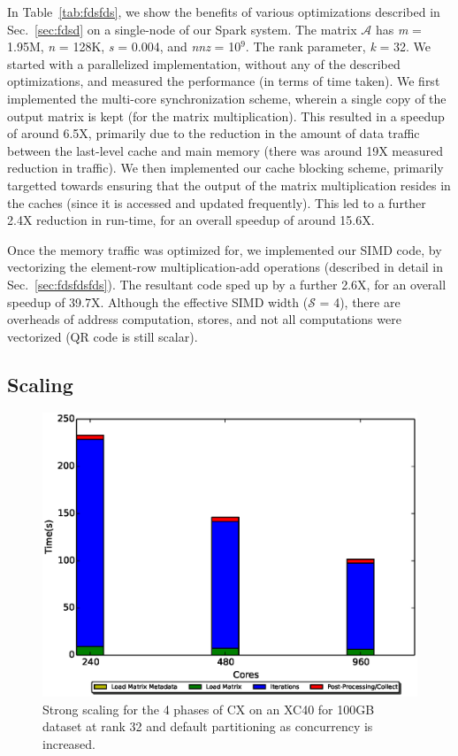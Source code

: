   In Table~\ref{tab:fdsfds}, we show the benefits of various
  optimizations described in Sec.~\ref{sec:fdsd} on a single-node of our Spark system. 
  The matrix $\mathcal{A}$ has {\it{m}} = 1.95M, {\it{n}} = 128K,
  {\it{s}} = 0.004, and {\it{nnz}} = 10$^9$. The rank parameter,
  {\it{k}} = 32. We started with a parallelized implementation,
  without any of the described optimizations, and measured the 
  performance (in terms of time taken). We first implemented the 
  multi-core synchronization scheme, wherein a single copy of the 
  output matrix is kept (for the matrix multiplication).
  This resulted in a speedup of around 6.5X, primarily due to
  the reduction in the amount of data traffic between the 
  last-level cache and main memory (there was around 19X measured reduction
  in traffic). We then implemented our cache blocking scheme,
  primarily targetted towards ensuring that the output of the 
  matrix multiplication resides in the caches (since it is
  accessed and updated frequently). This led to a further 2.4X
 reduction in run-time, for an overall speedup of around 15.6X.

 Once the memory traffic was optimized for, we implemented our 
 SIMD code, by vectorizing the element-row multiplication-add
 operations (described in detail in Sec.~\ref{sec:fdsfdsfds}). 
 The resultant code sped up by a further 2.6X, for an overall
 speedup of 39.7X. Although the effective SIMD width
 ($\mathcal{S}$ = 4), there are overheads of address computation,
 stores, and not all computations were vectorized (QR code is still
 scalar).
 



  \subsection{Scaling}
    \begin{figure} [H]
    \begin{centering}
    \includegraphics[scale=0.4]{images/CX_Strong_Scaling_Rank_32_Partitions_default.eps}
    \end{centering}
    \caption{ Strong scaling for the 4 phases of CX on an XC40 for 100GB dataset at rank 32 and default partitioning as concurrency is increased.} 
    \end{figure} 


